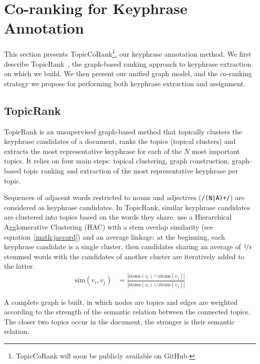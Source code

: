 \section{Co-ranking for Keyphrase Annotation}
\label{sec:topicrankpp}

  This section presents TopicCoRank\footnote{TopicCoRank will soon be publicly available on GitHub.}, our keyphrase annotation method.
  We first describe TopicRank~\cite{bougouin2013topicrank}, the 
  graph-based ranking approach to keyphrase extraction on which we build.
  We then present our unified graph model, and the co-ranking
  strategy we propose for performing both keyphrase extraction and assignment.
  
  \subsection{TopicRank}
  \label{subsec:topicrank}
    TopicRank is an unsupervised graph-based method that topically clusters the
    keyphrase candidates of a document, ranks the topics (topical clusters) and extracts the
    most representative keyphrase for each of the $N$ most important topics. It
    relies on four main steps: topical clustering, graph construction,
    graph-based topic ranking and extraction of the most representative keyphrase
    per topic.
    
    Sequences of adjacent words restricted to nouns and adjectives (\texttt{/(N|A)+/}) are 
    considered as keyphrase candidates.
    In TopicRank, similar keyphrase candidates are clustered into topics based
    on the words they share.
     use a Hierarchical
    Agglomerative Clustering (HAC) with a stem overlap similarity (see equation~\ref{math:jaccard}) and an average linkage: at
    the beginning, each keyphrase candidate is a single cluster, then candidates
    sharing an average of $\unitfrac{1}{4}$ stemmed words with the candidates of
    another cluster are iteratively added to the latter.
    \begin{align}
      \text{sim}(v_i, v_j) &= \frac{|\text{stems}(v_i) \cap \text{stems}(v_j)|}{|\text{stems}(v_i) \cup \text{stems}(v_j)|} \label{math:jaccard}
    \end{align}
    
    A complete graph is built, in which nodes are topics and edges are weighted according to the strength of the semantic
    relation between the connected topics. The closer two topics occur in the
    document, the stronger is their semantic relation.
    
